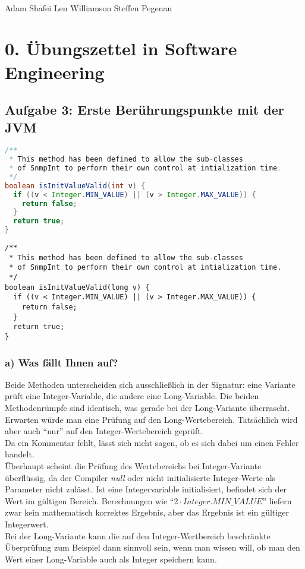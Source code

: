 \documentclass[a4paper,10pt]{article}
\begin{document}
\hfill \\
Adam Shafei \hfill Len Williamson \hfill Steffen Pegenau
\section*{0. Übungszettel in Software Engineering}

\subsection*{Aufgabe 3: Erste Berührungspunkte mit der JVM}
\begin{lstlisting}[caption={Methode \textit{isInitValueValid} mit Parameter vom Typ
\textit{Integer}},label=lst:validValueInt,language=Java]
/**
 * This method has been defined to allow the sub-classes
 * of SnmpInt to perform their own control at intialization time.
 */
boolean isInitValueValid(int v) {
  if ((v < Integer.MIN_VALUE) || (v > Integer.MAX_VALUE)) {
    return false;
  }
  return true;
}
\end{lstlisting}
\begin{lstlisting}[caption={Methode \textit{isInitValueValid} mit Parameter vom Typ \textit{Long}},label=lst:validValueLong]
/**
 * This method has been defined to allow the sub-classes
 * of SnmpInt to perform their own control at intialization time.
 */
boolean isInitValueValid(long v) {
  if ((v < Integer.MIN_VALUE) || (v > Integer.MAX_VALUE)) {
    return false;
  }
  return true;
}
\end{lstlisting}

\subsubsection*{a) Was fällt Ihnen auf?}
Beide Methoden unterscheiden sich ausschließlich in der Signatur: eine Variante prüft eine Integer-Variable, die andere eine Long-Variable. Die beiden Methodenrümpfe sind identisch, was gerade bei der Long-Variante überrascht. Erwarten würde man eine Prüfung auf den Long-Wertebereich. Tatsächlich wird aber auch ``nur'' auf den Integer-Wertebereich geprüft. \\
Da ein Kommentar fehlt, lässt sich nicht sagen, ob es sich dabei um einen Fehler handelt. \\
Überhaupt scheint die Prüfung des Wertebereichs bei Integer-Variante überflüssig, da der Compiler \textit{null} oder nicht initialisierte Integer-Werte als Parameter nicht zulässt. Ist eine Integervariable initialisiert, befindet sich der Wert im gültigen Bereich. Berechnungen wie
``$2 \cdot Integer.MIN\_VALUE$''
liefern zwar kein mathematisch korrektes Ergebnis, aber das Ergebnis ist ein gültiger Integerwert. \\
Bei der Long-Variante kann die auf den Integer-Wertbereich beschränkte Überprüfung zum Beispiel dann sinnvoll sein, wenn man wissen will, ob man den Wert einer Long-Variable auch als Integer speichern kann.
\end{document}
